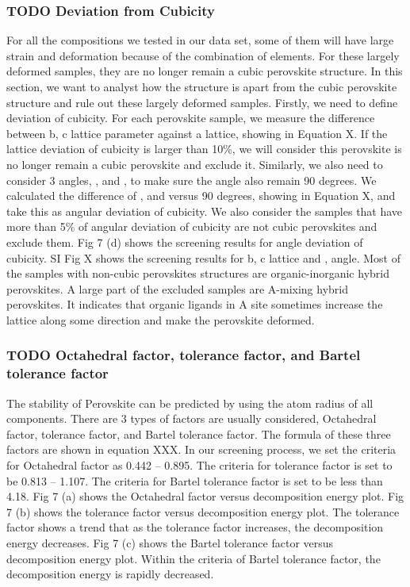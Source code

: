 \documentclass[twoside, twocolumn, 9pt, draft]{article}
\begin{document}
\subsubsection*{{\bfseries\sffamily TODO} Deviation from Cubicity}
\label{sec:orga2fc91f}
For all the compositions we tested in our data set, some of them will
have large strain and deformation because of the combination of
elements. For these largely deformed samples, they are no longer
remain a cubic perovskite structure. In this section, we want to
analyst how the structure is apart from the cubic perovskite structure
and rule out these largely deformed samples. Firstly, we need to
define deviation of cubicity. For each perovskite sample, we measure
the difference between b, c lattice parameter against a lattice,
showing in Equation X. If the lattice deviation of cubicity is larger
than 10\%, we will consider this perovskite is no longer remain a cubic
perovskite and exclude it.  Similarly, we also need to consider 3
angles, , and , to make sure the angle also remain 90 degrees. We
calculated the difference of , and versus 90 degrees, showing in
Equation X, and take this as angular deviation of cubicity. We also
consider the samples that have more than 5\% of angular deviation of
cubicity are not cubic perovskites and exclude them. Fig 7 (d) shows
the screening results for angle deviation of cubicity. SI Fig X shows
the screening results for b, c lattice and , angle. Most of the
samples with non-cubic perovskites structures are organic-inorganic
hybrid perovskites. A large part of the excluded samples are A-mixing
hybrid perovskites. It indicates that organic ligands in A site
sometimes increase the lattice along some direction and make the
perovskite deformed.

\subsubsection*{{\bfseries\sffamily TODO} Octahedral factor, tolerance factor, and Bartel tolerance factor}
\label{sec:orgcd2c92c}
The stability of Perovskite can be predicted by using the atom radius
of all components. There are 3 types of factors are usually
considered, Octahedral factor, tolerance factor, and Bartel tolerance
factor. The formula of these three factors are shown in equation
XXX. In our screening process, we set the criteria for Octahedral
factor as 0.442 -- 0.895. The criteria for tolerance factor is set to
be 0.813 -- 1.107.  The criteria for Bartel tolerance factor is set to
be less than 4.18.  Fig 7 (a) shows the Octahedral factor versus
decomposition energy plot.  Fig 7 (b) shows the tolerance factor
versus decomposition energy plot.  The tolerance factor shows a trend
that as the tolerance factor increases, the decomposition energy
decreases. Fig 7 (c) shows the Bartel tolerance factor versus
decomposition energy plot. Within the criteria of Bartel tolerance
factor, the decomposition energy is rapidly decreased.
\end{document}
